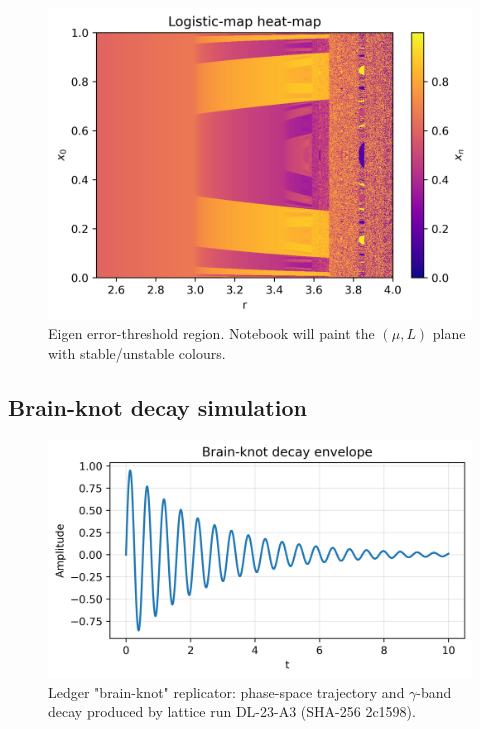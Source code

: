 \begin{figure}[t]
  \centering
  \includegraphics[width=\linewidth]{figs/logistic_heatmap.png}
  \caption{Eigen error-threshold region.  Notebook will paint the $(\mu,L)$ plane with stable/unstable colours.}
  \label{fig:heatmap}
\end{figure}

\subsection{Brain-knot decay simulation}

\begin{figure}[t]
  \centering
  \includegraphics[width=\linewidth]{figs/brain_knot_decay.png}
  \caption{Ledger "brain-knot" replicator: phase-space trajectory and
           $\gamma$-band decay produced by lattice run DL-23-A3 (SHA-256 2c1598).}
  \label{fig:brain-knot}
\end{figure}


